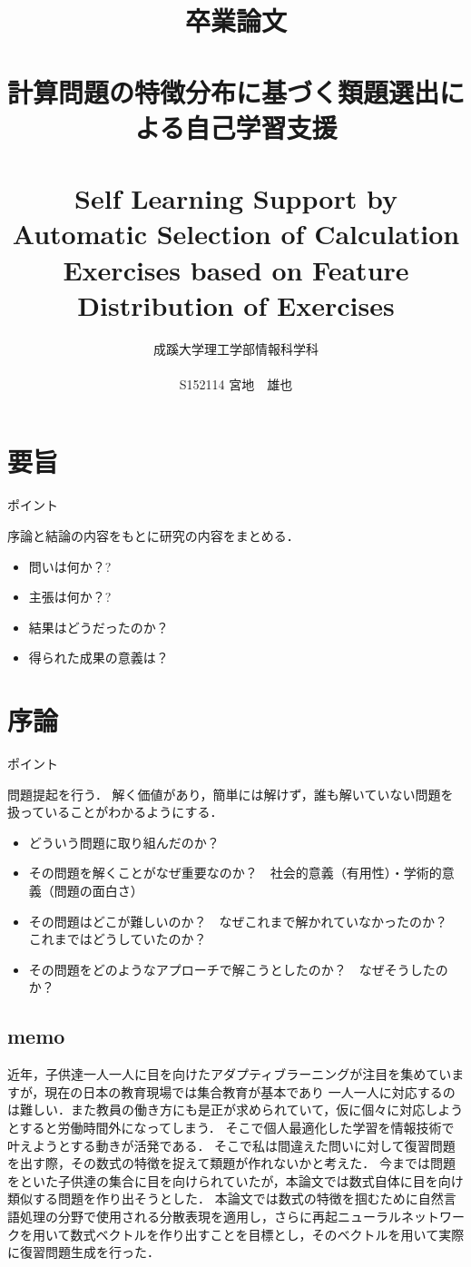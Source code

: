 \documentclass[a4j,11pt,report]{jsbook}
\title{卒業論文\\　\vspace{3em}\\{\huge #1}\\　\\#2\vspace{15em}}%
\author{{\huge 成蹊大学理工学部情報科学科}\\　\\{\huge #3}}%
\date{}
\newcommand{\frontpage}[3]{%
\title{卒業論文\\　\vspace{3em}\\{\huge #1}\\　\\#2\vspace{15em}}%
\author{{\huge 成蹊大学理工学部情報科学科}\\　\\{\huge #3}}%
\date{}
\maketitle
\clearpage
\thispagestyle{empty}

\clearpage
}
\newcommand{\point}[1]{
\begin{itembox}[l]{ポイント}
  #1
\end{itembox}
}
\begin{document}
\frontpage  %
{計算問題の特徴分布に基づく類題選出による自己学習支援}
{Self Learning Support by Automatic Selection of Calculation Exercises based on Feature Distribution of Exercises}
{S152114 宮地　雄也}

\chapter*{要旨}
\thispagestyle{empty}
\point{
序論と結論の内容をもとに研究の内容をまとめる．
\begin{itemize}
  \item 問いは何か？?
  \item 主張は何か？?
  \item 結果はどうだったのか？
  \item 得られた成果の意義は？
\end{itemize}
}

\tableofcontents
\thispagestyle{empty}
\clearpage
\thispagestyle{plain}
\setcounter{page}{1}

\chapter{序論 \label{ch:introduction}}

\point{
問題提起を行う．
解く価値があり，簡単には解けず，誰も解いていない問題を扱っていることがわかるようにする．
\begin{itemize}
  \item どういう問題に取り組んだのか？
  \item その問題を解くことがなぜ重要なのか？　社会的意義（有用性）・学術的意義（問題の面白さ）
  \item その問題はどこが難しいのか？　なぜこれまで解かれていなかったのか？　これまではどうしていたのか？
  \item その問題をどのようなアプローチで解こうとしたのか？　なぜそうしたのか？
\end{itemize}
}

\section{memo}
近年，子供達一人一人に目を向けたアダプティブラーニングが注目を集めていますが，現在の日本の教育現場では集合教育が基本であり
一人一人に対応するのは難しい．また教員の働き方にも是正が求められていて，仮に個々に対応しようとすると労働時間外になってしまう．
そこで個人最適化した学習を情報技術で叶えようとする動きが活発である．
そこで私は間違えた問いに対して復習問題を出す際，その数式の特徴を捉えて類題が作れないかと考えた．
今までは問題をといた子供達の集合に目を向けられていたが，本論文では数式自体に目を向け類似する問題を作り出そうとした．
本論文では数式の特徴を掴むために自然言語処理の分野で使用される分散表現を適用し，さらに再起ニューラルネットワークを用いて数式ベクトルを作り出すことを目標とし，そのベクトルを用いて実際に復習問題生成を行った．
\end{document}

